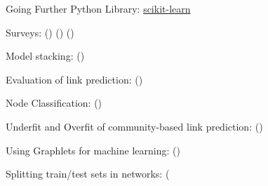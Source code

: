 \documentclass[a4paper,11pt]{book}
\begin{document}
\begin{textbox}{Going Further}
Python Library: \url{scikit-learn}

Surveys: (\cite{lichtenwalter2010new}) (\cite{al2006link}) (\cite{lu2011link}) 

Model stacking: (\cite{ghasemian2020stacking})

Evaluation of link prediction: (\cite{yang2015evaluating})

Node Classification: (\cite{bhagat2011node})

Underfit and Overfit of community-based link prediction: (\cite{ghasemian2019evaluating})

Using Graphlets for machine learning: (\cite{rahman2016link}) 

Splitting train/test sets in networks: (\cite{deexperimental}

\end{textbox}








\end{document}

